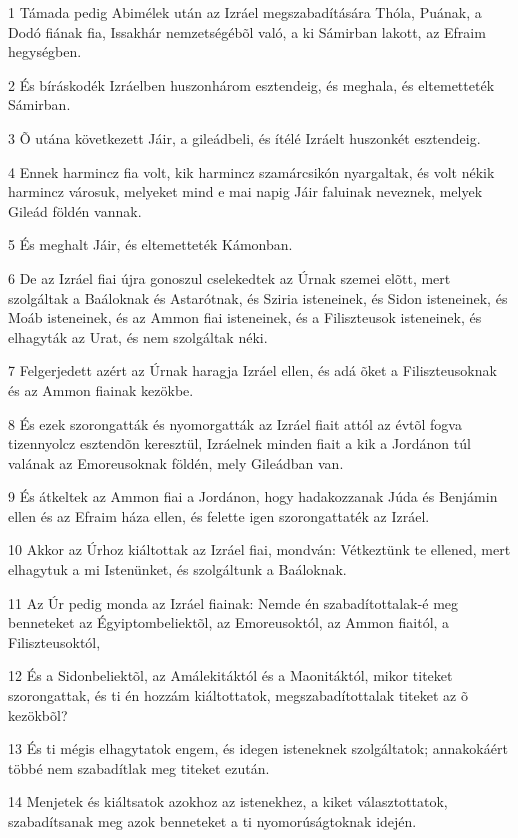 \par 1 Támada pedig Abimélek után az Izráel megszabadítására Thóla, Puának, a Dodó fiának fia, Issakhár nemzetségébõl való, a ki Sámirban lakott, az Efraim hegységben.
\par 2 És bíráskodék Izráelben huszonhárom esztendeig, és meghala, és eltemetteték Sámirban.
\par 3 Õ utána következett Jáir, a gileádbeli, és ítélé Izráelt huszonkét esztendeig.
\par 4 Ennek harmincz fia volt, kik harmincz szamárcsikón nyargaltak, és volt nékik harmincz városuk, melyeket mind e mai napig Jáir faluinak neveznek, melyek Gileád földén vannak.
\par 5 És meghalt Jáir, és eltemetteték Kámonban.
\par 6 De az Izráel fiai újra gonoszul cselekedtek az Úrnak szemei elõtt, mert szolgáltak a Baáloknak és Astarótnak, és Sziria isteneinek, és Sidon isteneinek, és Moáb isteneinek, és az Ammon fiai isteneinek, és a Filiszteusok isteneinek, és elhagyták az Urat, és nem szolgáltak néki.
\par 7 Felgerjedett azért az Úrnak haragja Izráel ellen, és adá õket a Filiszteusoknak és az Ammon fiainak kezökbe.
\par 8 És ezek szorongatták és nyomorgatták az Izráel fiait attól az évtõl fogva tizennyolcz esztendõn keresztül, Izráelnek minden fiait a kik a Jordánon túl valának az Emoreusoknak földén, mely Gileádban van.
\par 9 És átkeltek az Ammon fiai a Jordánon, hogy hadakozzanak Júda és Benjámin ellen és az Efraim háza ellen, és felette igen szorongattaték az Izráel.
\par 10 Akkor az Úrhoz kiáltottak az Izráel fiai, mondván: Vétkeztünk te ellened, mert elhagytuk a mi Istenünket, és szolgáltunk a Baáloknak.
\par 11 Az Úr pedig monda az Izráel fiainak: Nemde én szabadítottalak-é meg benneteket az Égyiptombeliektõl, az Emoreusoktól, az Ammon fiaitól, a Filiszteusoktól,
\par 12 És a Sidonbeliektõl, az Amálekitáktól és a Maonitáktól, mikor titeket szorongattak, és ti én hozzám kiáltottatok, megszabadítottalak titeket az õ kezökbõl?
\par 13 És ti mégis elhagytatok engem, és idegen isteneknek szolgáltatok; annakokáért többé nem szabadítlak meg titeket ezután.
\par 14 Menjetek és kiáltsatok azokhoz az istenekhez, a kiket választottatok, szabadítsanak meg azok benneteket a ti nyomorúságtoknak idején.

